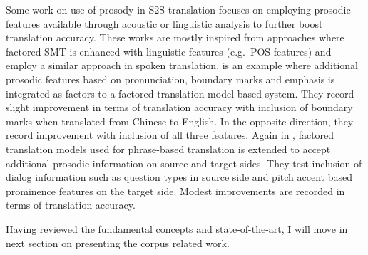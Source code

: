 Some work on use of prosody in S2S translation focuses on employing prosodic features available through acoustic or linguistic analysis to further boost translation accuracy. These works are mostly inspired from approaches where factored SMT is enhanced with linguistic features (e.g.~POS features) and employ a similar approach in spoken translation. \cite{Guo2016} is an example where additional prosodic features based on pronunciation, boundary marks and emphasis is integrated as factors to a factored translation model based system. They record slight improvement in terms of translation accuracy with inclusion of boundary marks when translated from Chinese to English. In the opposite direction, they record improvement with inclusion of all three features. Again in \cite{RangarajanSridhar:2013:enrichingS2S}, factored translation models used for phrase-based translation is extended to accept additional prosodic information on source and target sides. They test inclusion of dialog information such as question types in source side and pitch accent based prominence features on the target side. Modest improvements are recorded in terms of translation accuracy. 

Having reviewed the fundamental concepts and state-of-the-art, I will move in next section on presenting the corpus related work. 